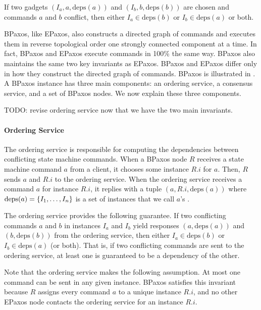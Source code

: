 \documentclass{mwhittaker}
\theoremstyle{definition}
\newcommand{\deps}[1]{\text{deps}(#1)}
\begin{document}
\begin{boxedinvariant}\label{inv:ConflictingGadgets}
  If two gadgets $(I_a, a, \deps{a})$ and $(I_b, b, \deps{b})$ are chosen and
  commands $a$ and $b$ conflict, then either $I_a \in \deps{b}$ or $I_b \in
  \deps{a}$ or both.
\end{boxedinvariant}

BPaxos, like EPaxos, also constructs a directed graph of commands and executes
them in reverse topological order one strongly connected component at a time.
In fact, BPaxos and EPaxos execute commands in 100\% the same way. BPaxos also
maintains the same two key invariants as EPaxos. BPaxos and EPaxos differ only
in how they construct the directed graph of commands.
%
BPaxos is illustrated in . A BPaxos instance has three main
components: an ordering service, a consensus service, and a set of BPaxos
nodes. We now explain these three components.

{}

TODO: revise ordering service now that we have the two main invariants.

\paragraph{Ordering Service}

The ordering service is responsible for computing the dependencies between
conflicting state machine commands. When a BPaxos node $R$ receives a state
machine command $a$ from a client, it chooses some instance $R.i$ for $a$.
Then, $R$ sends $a$ and $R.i$ to the ordering service. When the ordering
service receives a command $a$ for instance $R.i$, it replies with a tuple $(a,
R.i, \deps{a})$ where $\deps{a} = \set{I_1, \ldots, I_n}$ is a set of instances
that we call $a$'s .

The ordering service provides the following guarantee. If two conflicting
commands $a$ and $b$ in instances $I_a$ and $I_b$ yield responses $(a,
\deps{a})$ and $(b, \deps{b})$ from the ordering service, then either $I_a \in
\deps{b}$ or $I_b \in \deps{a}$ (or both). That is, if two conflicting commands
are sent to the ordering service, at least one is guaranteed to be a dependency
of the other.

Note that the ordering service makes the following assumption. At most one
command can be sent in any given instance. BPaxos satisfies this invariant
because $R$ assigns every command $a$ to a unique instance $R.i$, and no other
EPaxos node contacts the ordering service for an instance $R.i$.
\end{document}
